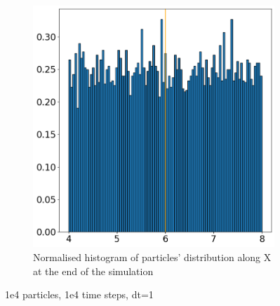 \documentclass{article}
\begin{document}
\begin{figure}[htbp]
\begin{subfigure}[b]{0.45\textwidth}
        \includegraphics[width=\textwidth]{images/histDl01Dr01RlPlRrPr.png}
        \caption{Normalised histogram of particles' distribution along X at the end of the simulation}
    \end{subfigure}
    \caption{1e4 particles, 1e4 time steps, dt=1}
    \label{fig:MatrixDiffusion3}
\end{figure}
\end{document}
